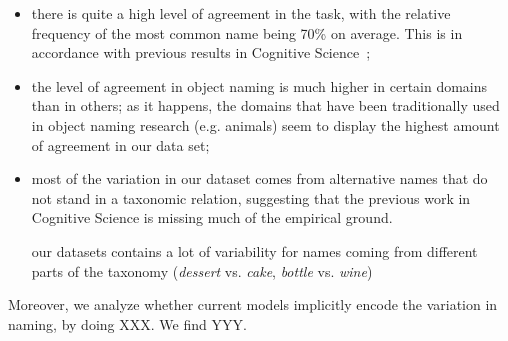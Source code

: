 \begin{itemize}
\item there is quite a high level of agreement in the task, with the relative frequency of the most common name being 70\% on average. This is in accordance with previous results in Cognitive Science~\cite{add-ref};
\item the level of agreement in object naming is much higher in certain domains than in others; as it happens, the domains that have been traditionally used in object naming research (e.g. animals) seem to display the highest amount of agreement in our data set;
\item most of the variation in our dataset comes from alternative names that do not stand in a taxonomic relation, suggesting that the previous work in Cognitive Science is missing much of the empirical ground.

our datasets contains a lot of variability for names coming from different parts of the taxonomy (\emph{dessert} vs. \emph{cake}, \emph{bottle} vs. \emph{wine})
\end{itemize}

Moreover, we analyze whether current models implicitly encode the variation in naming, by doing XXX. We find YYY.



